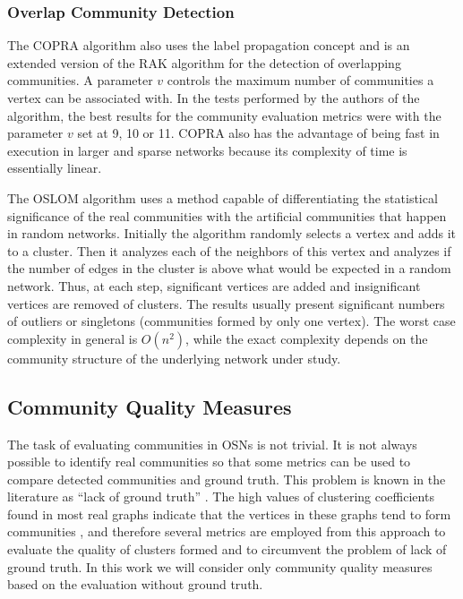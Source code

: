 \subsubsection*{Overlap Community Detection}
\label{subsec:overlap_comm_detection}

The COPRA algorithm also uses the label propagation concept and is an extended version of the RAK algorithm for the detection of overlapping communities. A parameter $v$ controls the maximum number of communities a vertex can be associated with. In the tests performed by the authors of the algorithm, the best results for the community evaluation metrics were with the parameter $v$ set at 9, 10 or 11. COPRA also has the advantage of being fast in execution in larger and sparse networks because its complexity of time is essentially linear.

The OSLOM algorithm uses a method capable of differentiating the statistical significance of the real communities with the artificial communities that happen in random networks. Initially the algorithm randomly selects a vertex and adds it to a cluster. Then it analyzes each of the neighbors of this vertex and analyzes if the number of edges in the cluster is above what would be expected in a random network. Thus, at each step, significant vertices are added and insignificant vertices are removed of clusters. The results usually present significant numbers of outliers or singletons (communities formed by only one vertex). The worst case complexity in general is $O(n^2)$, while the exact complexity depends on the community structure of the underlying network under study.

\subsection{Community Quality Measures}
\label{sec:comm_quality}

The task of evaluating communities in OSNs is not trivial. It is not always possible to identify real communities so that some metrics can be used to compare detected communities and ground truth. This problem is known in the literature as ``lack of ground truth'' \cite{Zafarani2015}. The high values of clustering coefficients found in most real graphs indicate that the vertices in these graphs tend to form communities \cite{Girvan7821}, and therefore several metrics are employed from this approach to evaluate the quality of clusters formed and to circumvent the problem of lack of ground truth. In this work we will consider only community quality measures based on the evaluation without ground truth.

